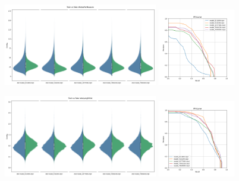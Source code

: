 \begin{figure}[!ht]
    \centering
    \includegraphics[width=0.6\textwidth]{../images/realworldexperiments/scarlatti/violinplots/TrainVsFake_nNotesPerMeasure.png}
    \includegraphics[width=0.3\textwidth]{../images/realworldexperiments/scarlatti/prcurves/PRCurveScarlatti_nNotesPerMeasure.png}
\end{figure} 
\begin{figure}[!ht]
    \centering
    \includegraphics[width=0.6\textwidth]{../images/realworldexperiments/scarlatti/violinplots/TrainVsFake_noteLengthHist.png}
    \includegraphics[width=0.3\textwidth]{../images/realworldexperiments/scarlatti/prcurves/PRCurveScarlatti_noteLengthHist.png}
\end{figure}   
